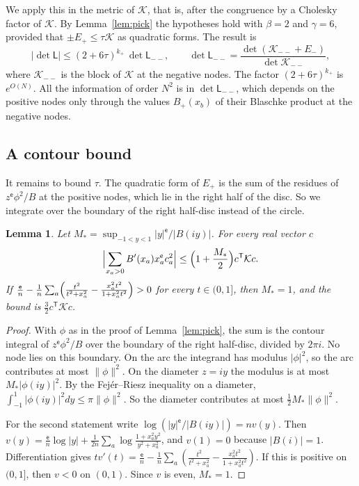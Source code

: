 \documentclass[11pt]{amsart}
\newtheorem{lemma}[theorem]{Lemma}
\theoremstyle{definition}
\theoremstyle{remark}
\numberwithin{equation}{section}
\newcommand{\cK}{\mathcal K}
\begin{document}
We apply this in the metric of $\cK$, that is, after the congruence by a Cholesky factor of $\cK$. By
Lemma~\ref{lem:pick} the hypotheses hold with $\beta=2$ and $\gamma=6$, provided that $\pm E_+\le\tau\cK$ as
quadratic forms. The result is
\begin{equation}\label{eq:C3}
 |\det\mathsf L|\le(2+6\tau)^{k_+}\,\det\mathsf L_{--},\qquad
 \det\mathsf L_{--}=\frac{\det(\cK_{--}+E_-)}{\det\cK_{--}},
\end{equation}
where $\cK_{--}$ is the block of $\cK$ at the negative nodes. The factor $(2+6\tau)^{k_+}$ is $e^{O(N)}$. All
the information of order $N^2$ is in $\det\mathsf L_{--}$, which depends on the positive nodes only through
the values $B_+(x_b)$ of their Blaschke product at the negative nodes.

\subsection{A contour bound}\label{ssec:T}
It remains to bound $\tau$. The quadratic form of $E_+$ is the sum of the residues of $z^{\mathsf e}\phi^2/B$ at
the positive nodes, which lie in the right half of the disc. So we integrate over the boundary of the right
half-disc instead of the circle.

\begin{lemma}\label{lem:T}
Let $M_*=\sup_{-1<y<1}|y|^{\mathsf e}/|B(iy)|$. For every real vector $c$
\[
 \Bigl|\sum_{x_a>0}B'(x_a)x_a^{\mathsf e}c_a^2\Bigr|\le\Bigl(1+\frac{M_*}2\Bigr)c^{\mathsf T}\cK c .
\]
If $\frac{\mathsf e}n-\frac1n\sum_a\Bigl(\frac{t^2}{t^2+x_a^2}-\frac{x_a^2t^2}{1+x_a^2t^2}\Bigr)>0$ for every
$t\in(0,1]$, then $M_*=1$, and the bound is $\frac32c^{\mathsf T}\cK c$.
\end{lemma}

\begin{proof}
With $\phi$ as in the proof of Lemma~\ref{lem:pick}, the sum is the contour integral of $z^{\mathsf e}\phi^2/B$
over the boundary of the right half-disc, divided by $2\pi i$. No node lies on this boundary. On the arc the
integrand has modulus $|\phi|^2$, so the arc contributes at most $\|\phi\|^2$. On the diameter $z=iy$ the
modulus is at most $M_*|\phi(iy)|^2$. By the Fej\'er--Riesz inequality on a diameter,
$\int_{-1}^1|\phi(iy)|^2dy\le\pi\|\phi\|^2$. So the diameter contributes at most $\frac12M_*\|\phi\|^2$.

For the second statement write $\log(|y|^{\mathsf e}/|B(iy)|)=nv(y)$. Then
$v(y)=\frac{\mathsf e}n\log|y|+\frac1{2n}\sum_a\log\frac{1+x_a^2y^2}{y^2+x_a^2}$, and $v(1)=0$ because $|B(i)|=1$.
Differentiation gives $tv'(t)=\frac{\mathsf e}n-\frac1n\sum_a(\frac{t^2}{t^2+x_a^2}-\frac{x_a^2t^2}{1+x_a^2t^2})$.
If this is positive on $(0,1]$, then $v<0$ on $(0,1)$. Since $v$ is even, $M_*=1$.
\end{proof}
\end{document}
